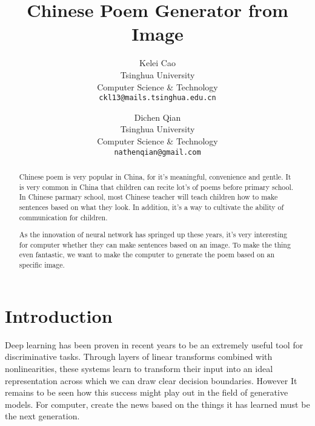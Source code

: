 \documentclass[10pt,twocolumn,letterpaper]{article}
\begin{document}
\title{ Chinese Poem Generator from Image}

\author{Kelei Cao\\
Tsinghua University \\
Computer Science \& Technology\\
{\tt\small ckl13@mails.tsinghua.edu.cn}
\and
Dichen Qian\\
Tsinghua University \\
Computer Science \& Technology\\
{\tt\small nathenqian@gmail.com}
}

\maketitle

\begin{abstract}
   	Chinese poem is very popular in China, for it's meaningful, convenience and gentle. It is very common in China that children can recite lot's of poems before primary school. 
	In Chinese parmary school, most Chinese teacher will teach children how to make sentences based on what they look. In addition, it's a way to cultivate the ability of communication for children.

	As the innovation of neural network has springed up these years, it's very interesting for computer whether they can make sentences based on an image. To make the thing even fantastic, we want to make the computer to generate the poem based on an specific image.
	
\end{abstract}

\section{Introduction}
Deep learning has been proven in recent years to be an extremely useful tool for discriminative tasks. Through layers of linear transforms combined with nonlinearities, these systems learn to transform their input into an ideal representation across which we can draw clear decision boundaries. However It remains to be seen how this success might play out in the field of generative models. For computer, create the news based on the things it has learned must be the next generation.
\end{document}
